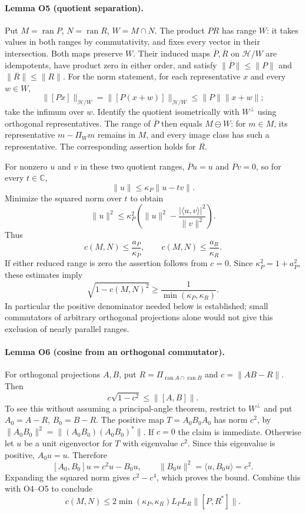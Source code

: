 \paragraph{Lemma O5 (quotient separation).}
Put $M=\operatorname{ran}P$, $N=\operatorname{ran}R$, $W=M\cap N$.
The product $PR$ has range $W$: it takes values in both ranges by
commutativity, and fixes every vector in their intersection.
Both maps preserve $W$. Their induced maps $\overline P,\overline R$
on $\mathcal H/W$ are idempotents, have product zero in either order, and
satisfy $\|\overline P\|\leq\|P\|$ and $\|\overline R\|\leq\|R\|$.
For the norm statement, for each representative $x$ and every $w\in W$,
\[
 \|[Px]\|_{\mathcal H/W}
 =\|[P(x+w)]\|_{\mathcal H/W}\leq\|P\|\|x+w\|;
\]
take the infimum over $w$. Identify the quotient isometrically with
$W^\perp$ using orthogonal representatives. The range of $\overline P$
then equals $M\ominus W$: for $m\in M$, its representative
$m-\Pi_Wm$ remains in $M$, and every image class has such a representative.
The corresponding assertion holds for $R$.

For nonzero $u$ and $v$ in these two quotient ranges,
$\overline P u=u$ and $\overline P v=0$, so for every $t\in\mathbb C$,
\[
 \|u\|\leq\kappa_P\|u-tv\|.
\]
Minimize the squared norm over $t$ to obtain
\[
 \|u\|^2\leq\kappa_P^2
 \left(\|u\|^2-\frac{|\langle u,v\rangle|^2}{\|v\|^2}\right).
\]
Thus
\begin{equation}
 c(M,N)\leq \frac{a_P}{\kappa_P},\qquad
 c(M,N)\leq \frac{a_R}{\kappa_R}.
 \label{urgent:quotient-separation}
\end{equation}
If either reduced range is zero the assertion follows from $c=0$.
Since $\kappa_P^2=1+a_P^2$, these estimates imply
\[
 \sqrt{1-c(M,N)^2}\geq
 \frac1{\min(\kappa_P,\kappa_R)}.
\]
In particular the positive denominator needed below is established;
small commutators of arbitrary orthogonal projections alone would not
give this exclusion of nearly parallel ranges.

\paragraph{Lemma O6 (cosine from an orthogonal commutator).}
For orthogonal projections $A,B$, put
$R=\Pi_{\operatorname{ran}A\cap\operatorname{ran}B}$ and
$c=\|AB-R\|$. Then
\begin{equation}
 c\sqrt{1-c^2}\leq\|[A,B]\|.
 \label{urgent:cosine-commutator}
\end{equation}
To see this without assuming a principal-angle theorem, restrict to
$W^\perp$ and put $A_0=A-R$, $B_0=B-R$.
The positive map $T=A_0B_0A_0$ has norm $c^2$, by
$\|A_0B_0\|^2=\|(A_0B_0)(A_0B_0)^*\|$.
If $c=0$ the claim is immediate. Otherwise let $u$ be a unit eigenvector
for $T$ with eigenvalue $c^2$. Since this eigenvalue is positive,
$A_0u=u$. Therefore
\[
 [A_0,B_0]u=c^2u-B_0u,\qquad
 \|B_0u\|^2=\langle u,B_0u\rangle=c^2.
\]
Expanding the squared norm gives $c^2-c^4$, which proves the bound.
Combine this with O4--O5 to conclude
\begin{equation}
 c(M,N)\leq
 2\min(\kappa_P,\kappa_R)L_PL_R\|[P,R^*]\|.
 \label{urgent:adjoint-cosine}
\end{equation}

